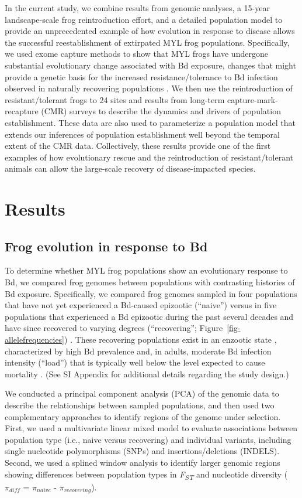 \documentclass[9pt,twocolumn,twoside,lineno]{pnas-new}
\begin{document}
In the current study, we combine results from genomic analyses, a
15-year landscape-scale frog reintroduction effort, and a detailed
population model to provide an unprecedented example of how evolution in
response to disease allows the successful reestablishment of extirpated
MYL frog populations. Specifically, we used exome capture methods to
show that MYL frogs have undergone substantial evolutionary change
associated with Bd exposure, changes that might provide a genetic basis
for the increased resistance/tolerance to Bd infection observed in
naturally recovering populations \citep{knapp2016}. We then use the
reintroduction of resistant/tolerant frogs to 24 sites and results from
long-term capture-mark-recapture (CMR) surveys to describe the dynamics
and drivers of population establishment. These data are also used to
parameterize a population model that extends our inferences of
population establishment well beyond the temporal extent of the CMR
data. Collectively, these results provide one of the first examples of
how evolutionary rescue and the reintroduction of resistant/tolerant
animals can allow the large-scale recovery of disease-impacted species.

\section*{Results}

\subsection*{Frog evolution in response to Bd}

To determine whether MYL frog populations show an evolutionary response
to Bd, we compared frog genomes between populations with contrasting
histories of Bd exposure. Specifically, we compared frog genomes sampled
in four populations that have not yet experienced a Bd-caused epizootic
(``naive'') \citep{zhou2015} versus in five populations that experienced
a Bd epizootic during the past several decades and have since recovered
to varying degrees (``recovering''; Figure~\ref{fig-allelefrequencies})
\citep{knapp2016, vredenburg2010}. These recovering populations exist in
an enzootic state \citep{briggs2010}, characterized by high Bd
prevalence and, in adults, moderate Bd infection intensity (``load'')
that is typically well below the level expected to cause mortality
\citep{vredenburg2010}. (See SI Appendix for additional details
regarding the study design.)

We conducted a principal component analysis (PCA) of the genomic data to
describe the relationships between sampled populations, and then used
two complementary approaches to identify regions of the genome under
selection. First, we used a multivariate linear mixed model to evaluate
associations between population type (i.e., naive versus recovering) and
individual variants, including single nucleotide polymorphisms (SNPs)
and insertions/deletions (INDELS). Second, we used a splined window
analysis to identify larger genomic regions showing differences between
population types in \emph{F\textsubscript{ST}} and nucleotide diversity
(\(\pi_{diff}\) = \(\pi_{naive}\) - \(\pi_{recovering}\)).
\end{document}
